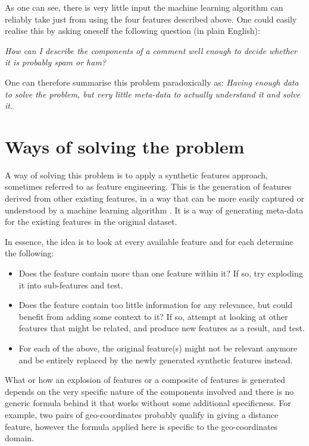 As one can see, there is very little input the machine learning algorithm can reliably take just from using the four features described above. One could easily realise this by asking oneself the following question (in plain English):

\qquad \emph{How can I describe the components of a comment well enough to decide whether it is probably spam or ham?}

One can therefore summarise this problem paradoxically as: \emph{Having enough data to solve the problem, but very little meta-data to actually understand it and solve it.}

\section{Ways of solving the problem}
A way of solving this problem is to apply a synthetic features approach, sometimes referred to as feature engineering. This is the generation of features derived from other existing features, in a way that can be more easily captured or understood by a machine learning algorithm \citep{LiFeatureEng}. It is a way of generating meta-data for the existing features in the original dataset.

In essence, the idea is to look at every available feature and for each determine the following:

\begin{itemize}
    \item Does the feature contain more than one feature within it? If so, try exploding it into sub-features and test.
    \item Does the feature contain too little information for any relevance, but could benefit from adding some context to it? If so, attempt at looking at other features that might be related, and produce new features as a result, and test.
    \item For each of the above, the original feature(s) might not be relevant anymore and be entirely replaced by the newly generated synthetic features instead.
\end{itemize}

What or how an explosion of features or a composite of features is generated depends on the very specific nature of the components involved and there is no generic formula behind it that works without some additional specificness. For example, two pairs of geo-coordinates probably qualify in giving a distance feature, however the formula applied here is specific to the geo-coordinates domain.

